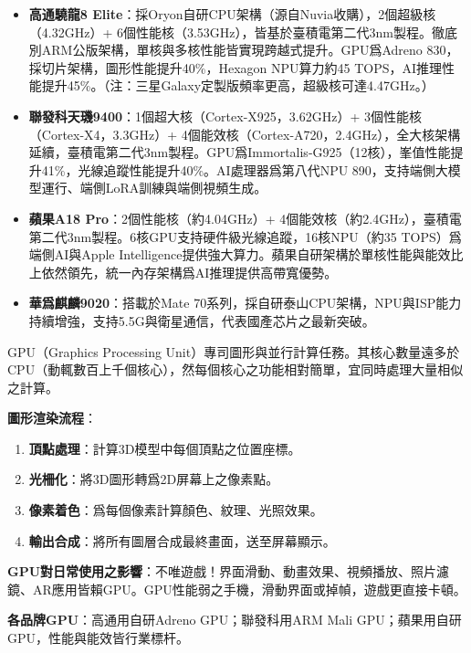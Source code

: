 \begin{itemize}
  \item \textbf{高通驍龍8 Elite}：採Oryon自研CPU架構（源自Nuvia收購），2個超級核（4.32GHz）+ 6個性能核（3.53GHz），皆基於臺積電第二代3nm製程。徹底別ARM公版架構，單核與多核性能皆實現跨越式提升。GPU爲Adreno 830，採切片架構，圖形性能提升40\%，Hexagon NPU算力約45 TOPS，AI推理性能提升45\%。（注：三星Galaxy定製版頻率更高，超級核可達4.47GHz。）
  \item \textbf{聯發科天璣9400}：1個超大核（Cortex-X925，3.62GHz）+ 3個性能核（Cortex-X4，3.3GHz）+ 4個能效核（Cortex-A720，2.4GHz），全大核架構延續，臺積電第二代3nm製程。GPU爲Immortalis-G925（12核），峯值性能提升41\%，光線追蹤性能提升40\%。AI處理器爲第八代NPU 890，支持端側大模型運行、端側LoRA訓練與端側視頻生成。
  \item \textbf{蘋果A18 Pro}：2個性能核（約4.04GHz）+ 4個能效核（約2.4GHz），臺積電第二代3nm製程。6核GPU支持硬件級光線追蹤，16核NPU（約35 TOPS）爲端側AI與Apple Intelligence提供強大算力。蘋果自研架構於單核性能與能效比上依然領先，統一內存架構爲AI推理提供高帶寬優勢。
  \item \textbf{華爲麒麟9020}：搭載於Mate 70系列，採自研泰山CPU架構，NPU與ISP能力持續增強，支持5.5G與衛星通信，代表國產芯片之最新突破。
\end{itemize}


GPU（Graphics Processing Unit）專司圖形與並行計算任務。其核心數量遠多於CPU（動輒數百上千個核心），然每個核心之功能相對簡單，宜同時處理大量相似之計算。

\textbf{圖形渲染流程}：

\begin{enumerate}
  \item \textbf{頂點處理}：計算3D模型中每個頂點之位置座標。
  \item \textbf{光柵化}：將3D圖形轉爲2D屏幕上之像素點。
  \item \textbf{像素着色}：爲每個像素計算顏色、紋理、光照效果。
  \item \textbf{輸出合成}：將所有圖層合成最終畫面，送至屏幕顯示。
\end{enumerate}

\textbf{GPU對日常使用之影響}：不唯遊戲！界面滑動、動畫效果、視頻播放、照片濾鏡、AR應用皆賴GPU。GPU性能弱之手機，滑動界面或掉幀，遊戲更直接卡頓。

\textbf{各品牌GPU}：高通用自研Adreno GPU；聯發科用ARM Mali GPU；蘋果用自研GPU，性能與能效皆行業標杆。


